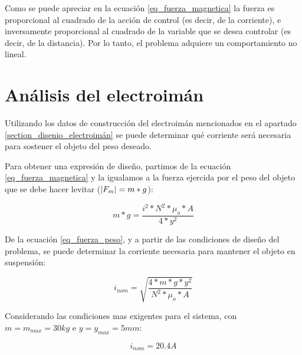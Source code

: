 \noindent Como se puede apreciar en la ecuación \ref{eq_fuerza_magnetica} la fuerza es proporcional al cuadrado de la acción de control (es decir, de la corriente), e inversamente proporcional al cuadrado de la variable que se desea controlar (es decir, de la distancia). Por lo tanto, el problema adquiere un comportamiento no lineal.


\section{Análisis del electroimán}

\noindent Utilizando los datos de construcción del electroimán mencionados en el apartado \ref{section_disenio_electroimán} se puede determinar qué corriente será necesaria para sostener el objeto del peso deseado.
	


\noindent Para obtener una expresión de diseño, partimos de la ecuación \ref{eq_fuerza_magnetica} y la igualamos a la fuerza ejercida por el peso del objeto que se debe hacer levitar ($\lvert F_{m}\rvert=m*g$):

\begin{equation}\label{eq_fuerza_peso}
	m*g=\frac{i^{2}*N^{2}*\mu_{o}*A}{4*y^{2}}
\end{equation}

\noindent De la ecuación \ref{eq_fuerza_peso}, y a partir de las condiciones de diseño del problema, se puede determinar la corriente necesaria para mantener el objeto en suspensión:

\begin{equation} \label{eq_corriente_peso}
	i_{nom}=\sqrt{\frac{4*m*g*y^{2}}{N^{2}*\mu_{o}*A}}
\end{equation}

Considerando las condiciones mas exigentes para el sistema, con $m=m_{max}=30kg$ e $y=y_{max}=5mm$:

\begin{equation}
	i_{nom}=20.4A
\end{equation}

